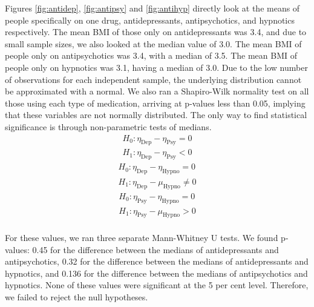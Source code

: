 \documentclass[12pt]{article}
\begin{document}
\newpage Figures \ref{fig:antidep}, \ref{fig:antipsy} and \ref{fig:antihyp} directly look at the means of people specifically on one drug, antidepressants, antipsychotics, and hypnotics respectively. The mean BMI of those only on antidepressants was 3.4, and due to small sample sizes, we also looked at the median value of 3.0. The mean BMI of people only on antipsychotics was 3.4, with a median of 3.5. The mean BMI of people only on hypnotics was 3.1, having a median of 3.0. Due to the low number of observations for each independent sample, the underlying distribution cannot be approximated with a normal. We also ran a Shapiro-Wilk normality test on all those using each type of medication, arriving at p-values less than 0.05, implying that these variables are not normally distributed. The only way to find statistical significance is through non-parametric tests of medians.
\begin{equation} 
    \begin{split}
        \label{mann_whitney_deppsy}
            H_0 :	\eta_{\text{Dep}} -\eta_{\text{Psy}} = 0 \\
            H_1 :	\eta_{\text{Dep}} - \eta_{\text{Psy}} < 0
    \end{split}
\end{equation}
\begin{equation}
    \begin{split}
     \label{mann_whitney_dephypno}
       H_0 :	\eta_{\text{Dep}}-\eta_{\text{Hypno}} = 0 \\
       H_1 :	\eta_{\text{Dep}}-\mu_{\text{Hypno}} \neq 0
    \end{split}
\end{equation}
\begin{equation} 
\begin{split}
\label{mann_whitney_psyhypno}
        H_0 :	\eta_{\text{Psy}}-\eta_{\text{Hypno}} = 0 \\
        H_1 :	\eta_{\text{Psy}}-\mu_{\text{Hypno}} > 0
        \end{split}
 \end{equation} \\


For these values, we ran three separate Mann-Whitney U tests. We found p-values: 0.45 for the difference between the medians of antidepressants and antipsychotics, 0.32 for the difference between the medians of antidepressants and hypnotics, and 0.136 for the difference between the medians of antipsychotics and hypnotics. None of these values were significant at the 5 per cent level. Therefore, we failed to reject the null hypotheses.\\
\end{document}
